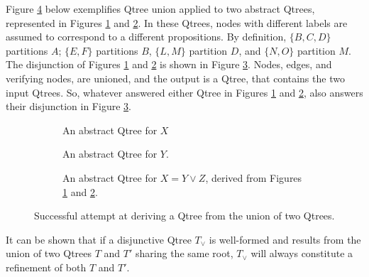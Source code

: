 Figure \ref{fig:qtree-x-y-z-disj-wellformed} below exemplifies Qtree union applied to two abstract Qtrees, represented in Figures \ref{fig:qtree-y} and \ref{fig:qtree-z}. In these Qtrees, nodes with different labels are assumed to correspond to a different propositions. By definition, $\lbrace B, C, D \rbrace$ partitions $A$; $\lbrace E, F \rbrace$ partitions $B$, $\lbrace L, M \rbrace$ partition $D$, and $\lbrace N, O \rbrace$ partition $M$. The disjunction of Figures \ref{fig:qtree-y} and \ref{fig:qtree-z} is shown in Figure \ref{fig:qtree-x-disj-wellformed}. Nodes, edges, and  verifying nodes, are unioned, and the output is a Qtree, that contains the two input Qtrees. So, whatever answered either Qtree in Figures \ref{fig:qtree-y} and \ref{fig:qtree-z}, also answers their disjunction in Figure \ref{fig:qtree-x-disj-wellformed}. 

\begin{figure}[H]
	\centering
	\begin{subfigure}[t]{.3\linewidth}
		\centering
		\scalebox{.7}{
			\begin{forest}
				[A[\fbox{B}[\fbox{E}][\fbox{F}]][C][\fbox{D}]]
		\end{forest}}
		\caption{An abstract Qtree for $X$}\label{fig:qtree-y}
	\end{subfigure}
	\hfill
	\begin{subfigure}[t]{.3\linewidth}
		\centering{}
		\caption{An abstract Qtree for $Y$.}\label{fig:qtree-z}
	\end{subfigure}
	\hfill
	\begin{subfigure}[t]{.3\linewidth}
		\centering{}
		\caption{An abstract Qtree for $X = Y \vee Z$, derived from Figures \ref{fig:qtree-y} and \ref{fig:qtree-z}.}\label{fig:qtree-x-disj-wellformed}
	\end{subfigure}
	\caption{Successful attempt at deriving a Qtree from the union of two Qtrees.}\label{fig:qtree-x-y-z-disj-wellformed}
\end{figure}

It can be shown that if a disjunctive Qtree $T_{\vee}$ is well-formed and results from the union of two Qtrees $T$ and $T'$ sharing the same root, $T_{\vee}$ will always constitute a refinement of both $T$ and $T'$.

